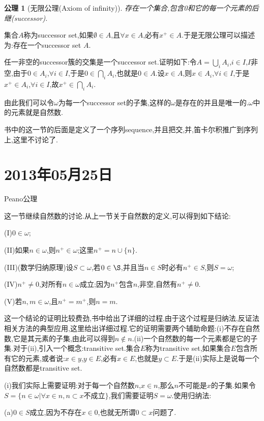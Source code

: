 \documentclass[12pt,a4paper,openany]{book}
\newtheorem{axiom}{公理}[section]
\begin{document}
\begin{axiom}[无限公理(Axiom of infinity)]
存在一个集合,包含0和它的每一个元素的后继(successor).
\end{axiom}

集合$A$称为successor set,如果$\emptyset \in A$,且$\forall x \in A$,必有$x^+ \in A$.于是无限公理可以描述为:存在一个successor set $A$.

任一非空的successor簇的交集是一个successor set.证明如下:令$A=\bigcup_{i}{A_i}$,$i \in I$,$I$非空,由于$0 \in A_i$,$\forall i \in I$,于是$0 \in \bigcap_{i}{A_i}$,也就是$0 \in A$.设$x \in A$,则$x \in A_i$,$\forall i \in I$,于是$x^+ \in A_i$,$\forall i \in I$,故$x^+ \in \bigcap_{i}{A_i}$.

由此我们可以令$\omega$为每一个successor set的子集,这样的$\omega$是存在的并且是唯一的.$\omega$中的元素就是自然数.

书中的这一节的后面是定义了一个序列sequence,并且把交,并,笛卡尔积推广到序列上,这里不讨论了.

\section{2013年05月25日}
Peano公理

这一节继续自然数的讨论.从上一节关于自然数的定义,可以得到如下结论:

(I)$0 \in \omega$;

(II)如果$n \in \omega$,则$n^+ \in \omega$;这里$n^+= n \cup \{n\}$.

(III)(数学归纳原理)设$S \subset \omega$,若$0 \in \S$,并且当$n \in S$时必有$n^+ \in S$,则$S=\omega$;

(IV)$n^+ \neq 0$,对所有$n \in \omega$成立;因为$n^+$包含$n$,非空,自然有$n^+ \neq 0$.

(V)若$n,m \in \omega$,且$n^+=m^+$,则$n=m$.

这一个结论的证明比较费劲,书中给出了详细的过程,由于这个过程是归纳法,反证法相关方法的典型应用,这里给出详细过程.它的证明需要两个辅助命题:(i)不存在自然数,它是其元素的子集,由此可以得到$n \notin n$.(ii)一个自然数的每一个元素都是它的子集.对于(ii),引入一个概念:transitive set.集合$E$称为transitive set,如果集合$E$包含所有它的元素,或者说:$x \in y$,$y \in E$,必有$x \in E$,也就是$y \subset E$.于是(ii)实际上是说每一个自然数都是transitive set.

(i)我们实际上需要证明:对于每一个自然数$n$,$x \in n$,那么$n$不可能是$x$的子集.如果令$S=\{n \in \omega| \forall x\in n, n \subset x \text{不成立}\}$,我们需要证明$S = \omega$.使用归纳法:

(a)$0 \in S$成立,因为不存在$x \in 0$,也就无所谓$0 \subset x$问题了.
\end{document}
